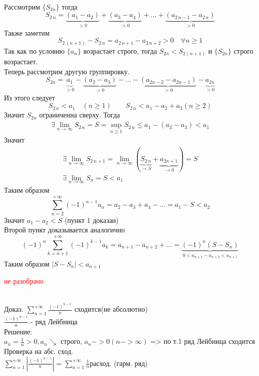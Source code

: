 \begin{Proof}~\\
    Рассмотрим $\{S_{2n}\}$ тогда
    \[
        S_{2\,n}=\underbrace{(a_1-a_2)}_{>0}+\underbrace{(a_3-a_4)}_{>0}+\dots+\underbrace{(a_{2\,n-1}-a_{2\,n})}_{>0} 
    \]
    Также заметим
    \[
        S_{2\,(n+1)} - S_{2\,n}= a_{2\,n+1}-a_{2\,n+2} > 0 \quad \forall n \geqslant 1
    \]
    Так как по условию $\{a_n\}$ возрастает строго, тогда $S_{2n}<S_{2(n+1)}$ и $\{S_{2n}\}$ строго возрастает.\\
    Теперь рассмотрим другую группировку.
    \[
        S_{2n}=\underbrace{a_1}_{>0}-\underbrace{(a_2-a_3)}_{>0}-\dots-\underbrace{(a_{2n-2}-a_{2n-1})}_{>0}-\underbrace{a_{2n}}_{>0}
    \]
    Из этого следует 
    \[
        S_{2\,n}<a_1 \quad (n \geqslant 1) \qquad S_{2\,n}<a_1-a_2+a_3(n \geqslant 2)
    \]
    Значит $S_{2n}$ ограниченна сверху. Тогда
    \begin{gather*}
        \exists \lim\limits_{n \to \infty} S_{2\,n} = S = \sup\limits_{n\geqslant 1} S_{2\,n} \leqslant a_1-(a_2-a_3) < a_1
    \end{gather*}
    Значит
    \begin{gather*}
        \exists \lim\limits_{n \to \infty}S_{2\,n+1}= 
        \lim\limits_{n\to\infty}(\underbrace{S_{2\,n}}_{\to S}+\underbrace{a_{2n+1}}_{\to 0})=S\\
        \exists \lim\limits_{n \to \infty}S_{n}=S<a_1
    \end{gather*}
    Таким образом
    \[
        \sum_{n=2}^{+\infty} (-1)^{n-1} a_n=a_2-a_3+a_4-\dots=a_1-S<a_2
    \]
    Значит $a_1-a_2<S$ (пункт 1 доказан)\\
    Второй пункт доказывается аналогично\\
    \[
        (-1)^n\sum_{k=n+1}^{+\infty} (-1)^{k-1} a_k=a_{n+1}-a_{n+2} + \dots =\underbrace{(-1)^n(S-S_n)}_{0 < a_{n+1}-a_{n+2} < a_{n + 1}}
    \]
    Таким образом $|S-S_n| < a_{n+1}$
\end{Proof}

\textcolor{red}{не разобрано}
\begin{Example}~\\
    Доказ. $\sum_{n=1}^{+\infty} \frac{(-1)^{n-1}}{n}$ сходится(не абсолютно)\\
    $\frac{(-1)^{n-1}}{n}$ - ряд Лейбница\\
    Решение:\\
    $a_n=\frac{1}{n}>0, {a_n}\searrow$ строго, $a_n->0 (n->\infty)$ => по т.1 ряд Лейбница сходится\\
    Проверка на абс. сход.\\
    $\sum_{n=1}^{+\infty}| \frac{(-1)^{n-1}}{n}|=\sum_{n=1}^{+\infty}\frac{1}{n}$расход. (гарм. ряд)\\
\end{Example}

